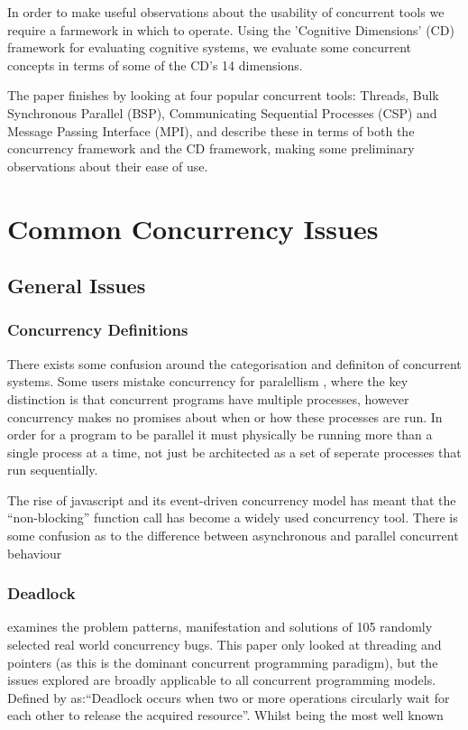 \documentclass{sig-alternate}
\begin{document}
In order to make useful observations about the usability of concurrent tools we require a farmework in which to operate. Using the 'Cognitive Dimensions' (CD) framework \cite{green89:_cognit_dimen_notat} for evaluating cognitive systems, we evaluate some concurrent concepts in terms of some of the CD's 14 dimensions. 

The paper finishes by looking at four popular concurrent tools: Threads, Bulk Synchronous Parallel (BSP), Communicating Sequential Processes (CSP) and Message Passing Interface (MPI), and describe these in terms of both the concurrency framework and the CD framework, making some preliminary observations about their ease of use.





\section{Common Concurrency Issues}
\subsection{General Issues}
\subsubsection{Concurrency Definitions}
There exists some confusion around the categorisation and definiton of concurrent systems. Some users mistake concurrency for paralellism \cite{pike13:_concur_paral}, where the key distinction is that concurrent programs have multiple processes, however concurrency makes no promises about when or how these processes are run. In order for a program to be parallel it must physically be running more than a single process at a time, not just be architected as a set of seperate processes that run sequentially.

The rise of javascript and its event-driven concurrency model has meant that the ``non-blocking'' function call has become a widely used concurrency tool. There is some confusion as to the difference between asynchronous and parallel concurrent behaviour

\subsubsection{Deadlock}
\cite{shanlu08:_learn_mistak_compr_study_real} examines the problem patterns, manifestation and solutions of 105 randomly selected real world concurrency bugs. This paper only looked at threading and pointers (as this is the dominant concurrent programming paradigm), but the issues explored are broadly applicable to all concurrent programming models.
Defined by \cite{shanlu08:_learn_mistak_compr_study_real} as:``Deadlock occurs when two or more operations circularly wait for each other to release the acquired resource''. Whilst being the most well known 
\end{document}
